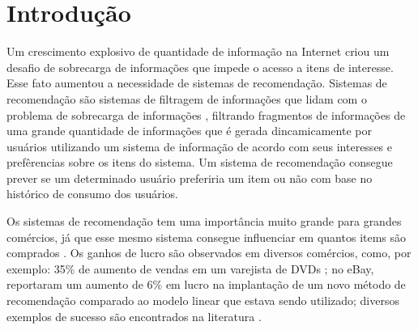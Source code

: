 \documentclass[sigconf]{acmart}
\begin{document}



\maketitle

\section{Introdução}

Um crescimento explosivo de quantidade de informação na Internet criou um desafio de sobrecarga de informações que impede o acesso a itens de interesse. Esse fato aumentou a necessidade de sistemas de recomendação. Sistemas de recomendação são sistemas de filtragem de informações que lidam com o problema de sobrecarga de informações \cite{konstan2012recommender}, filtrando fragmentos de informações de uma grande quantidade de informações que é gerada dincamicamente por usuários utilizando um sistema de informação de acordo com seus interesses e prefêrencias sobre os itens do sistema. Um sistema de recomendação consegue prever se um determinado usuário preferiria um item ou não com base no histórico de consumo dos usuários.

Os sistemas de recomendação tem uma importância muito grande para grandes comércios, já que esse mesmo sistema consegue influenciar em quantos items são comprados \cite{jannach2019measuring}. Os ganhos de lucro são observados em diversos comércios, como, por exemplo: 35\% de aumento de vendas em um varejista de DVDs \cite{lee2014impact}; no eBay, \citeauthor{brovman2016optimizing} reportaram um aumento de 6\% em lucro na implantação de um novo método de recomendação comparado ao modelo linear que estava sendo utilizado; diversos exemplos de sucesso são encontrados na literatura \cite{jannach2019measuring}.
\end{document}
